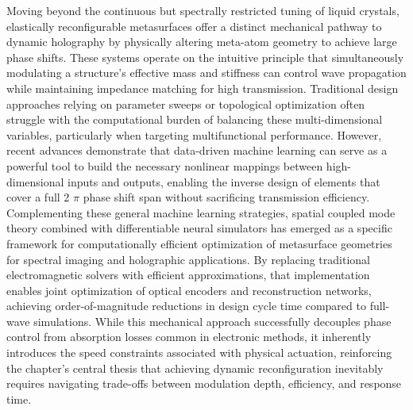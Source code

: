 \documentclass[11pt]{article}
\begin{document}
Moving beyond the continuous but spectrally restricted tuning of liquid crystals, elastically reconfigurable metasurfaces offer a distinct mechanical pathway to dynamic holography by physically altering meta-atom geometry to achieve large phase shifts. These systems operate on the intuitive principle that simultaneously modulating a structure's effective mass and stiffness can control wave propagation while maintaining impedance matching for high transmission. Traditional design approaches relying on parameter sweeps or topological optimization often struggle with the computational burden of balancing these multi-dimensional variables, particularly when targeting multifunctional performance. However, recent advances demonstrate that data-driven machine learning can serve as a powerful tool to build the necessary nonlinear mappings between high-dimensional inputs and outputs, enabling the inverse design of elements that cover a full 2 \(\pi\) phase shift span without sacrificing transmission efficiency. Complementing these general machine learning strategies, spatial coupled mode theory combined with differentiable neural simulators has emerged as a specific framework for computationally efficient optimization of metasurface geometries for spectral imaging and holographic applications. By replacing traditional electromagnetic solvers with efficient approximations, that implementation enables joint optimization of optical encoders and reconstruction networks, achieving order-of-magnitude reductions in design cycle time compared to full-wave simulations. While this mechanical approach successfully decouples phase control from absorption losses common in electronic methods, it inherently introduces the speed constraints associated with physical actuation, reinforcing the chapter's central thesis that achieving dynamic reconfiguration inevitably requires navigating trade-offs between modulation depth, efficiency, and response time. \citep{doi_10_1016_j_matdes_2022_111560_e69e3350} \citep{doi_10_1021_acsphotonics_4c00171_f68cb79c} \citep{s2_76a83ea3baed75ad88b7f0782eb9a694a330c853_cee16cac}
\end{document}
